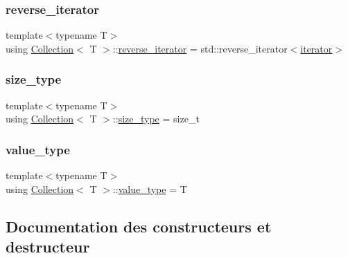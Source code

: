 \mbox{\label{class_collection_ac3805407b2dc537e71db7af070b8d8a6}} 
\subsubsection{\texorpdfstring{reverse\+\_\+iterator}{reverse\_iterator}}
{\footnotesize\ttfamily template$<$typename T$>$ \\
using \hyperlink{class_collection}{Collection}$<$ T $>$\+::\hyperlink{class_collection_ac3805407b2dc537e71db7af070b8d8a6}{reverse\+\_\+iterator} =  std\+::reverse\+\_\+iterator$<$\hyperlink{class_collection_a317dca4fdf1eb2e47643bb60c620f802}{iterator}$>$}

\mbox{\label{class_collection_a3f8b024f587aa20be530866da30948c4}} 
\subsubsection{\texorpdfstring{size\+\_\+type}{size\_type}}
{\footnotesize\ttfamily template$<$typename T$>$ \\
using \hyperlink{class_collection}{Collection}$<$ T $>$\+::\hyperlink{class_collection_a3f8b024f587aa20be530866da30948c4}{size\+\_\+type} =  size\+\_\+t}

\mbox{\label{class_collection_a30ecb2b5696f341f4b751019679c41e0}} 
\subsubsection{\texorpdfstring{value\+\_\+type}{value\_type}}
{\footnotesize\ttfamily template$<$typename T$>$ \\
using \hyperlink{class_collection}{Collection}$<$ T $>$\+::\hyperlink{class_collection_a30ecb2b5696f341f4b751019679c41e0}{value\+\_\+type} =  T}



\subsection{Documentation des constructeurs et destructeur}
\mbox{\label{class_collection_af6be61fb9648c2ac1ef7c8456b49a441}} 
